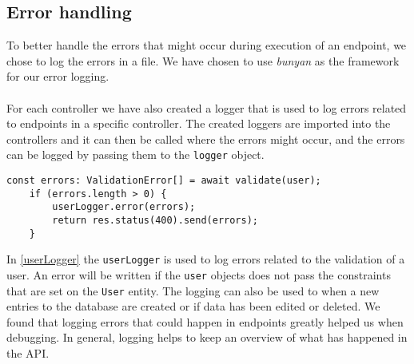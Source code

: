 \subsection{Error handling}
To better handle the errors that might occur during execution of an endpoint, we chose to log the errors in a file.
We have chosen to use \textit{bunyan} as the framework for our error logging.
\\\\
For each controller we have also created a logger that is used to log errors related to endpoints in a specific controller.
The created loggers are imported into the controllers and it can then be called where the errors might occur, and the errors can be logged by passing them to the \texttt{logger} object.
\begin{lstlisting}[caption={Shows how the userLogger is used to log errors}, captionpos=b, label={userLogger}]
    const errors: ValidationError[] = await validate(user);
    if (errors.length > 0) {
        userLogger.error(errors);
        return res.status(400).send(errors);
    }
\end{lstlisting}
In \autoref{userLogger} the \texttt{userLogger} is used to log errors related to the validation of a user. 
An error will be written if the \texttt{user} objects does not pass the constraints that are set on the \texttt{User} entity.
The logging can also be used to when a new entries to the database are created or if data has been edited or deleted.
We found that logging errors that could happen in endpoints greatly helped us when debugging.
In general, logging helps to keep an overview of what has happened in the API.